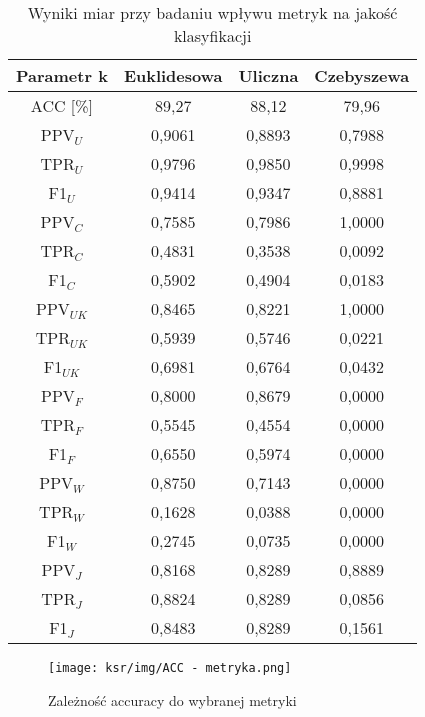 \documentclass{article}
\begin{document}
\begin{table}[H]
    \centering
    \begin{tabular}{|c|c|c|c|}
    \hline
    \textbf{Parametr k} & \textbf{Euklidesowa} & \textbf{Uliczna} & \textbf{Czebyszewa}  \\ \hline
    ACC [\%] & 89,27 & 88,12 & 79,96\\ \hline
    PPV\(_U\) & 0,9061 & 0,8893 & 0,7988\\ \hline
    TPR\(_U\) & 0,9796& 0,9850 & 0,9998\\ \hline
    F1\(_U\)  & 0,9414& 0,9347 & 0,8881\\ \hline
    PPV\(_C\) & 0,7585& 0,7986 & 1,0000\\ \hline
    TPR\(_C\) &  0,4831& 0,3538 & 0,0092\\ \hline
    F1\(_C\) & 0,5902& 0,4904 & 0,0183\\ \hline
    PPV\(_{UK}\) & 0,8465& 0,8221 & 1,0000\\ \hline
    TPR\(_{UK}\) & 0,5939& 0,5746 & 0,0221\\ \hline
    F1\(_{UK}\) & 0,6981& 0,6764 & 0,0432\\ \hline
    PPV\(_F\) & 0,8000& 0,8679 & 0,0000\\ \hline
    TPR\(_F\) & 0,5545& 0,4554 & 0,0000\\ \hline
    F1\(_F\) & 0,6550& 0,5974 & 0,0000\\ \hline
    PPV\(_W\) & 0,8750& 0,7143 & 0,0000\\ \hline
    TPR\(_W\) & 0,1628& 0,0388 & 0,0000\\ \hline
    F1\(_W\) & 0,2745& 0,0735 & 0,0000\\ \hline
    PPV\(_J\) & 0,8168& 0,8289 & 0,8889\\ \hline
    TPR\(_J\) & 0,8824& 0,8289 & 0,0856\\ \hline
    F1\(_J\) & 0,8483 & 0,8289 & 0,1561\\ \hline
    \end{tabular}
    \caption{Wyniki miar przy badaniu wpływu metryk na jakość klasyfikacji}
\end{table}
\begin{figure}[H]
    \centering
    \texttt{[image: ksr/img/ACC - metryka.png]}
    \caption{Zależność accuracy do wybranej metryki}
    \label{fig:moj-obraz}
\end{figure}
\end{document}
